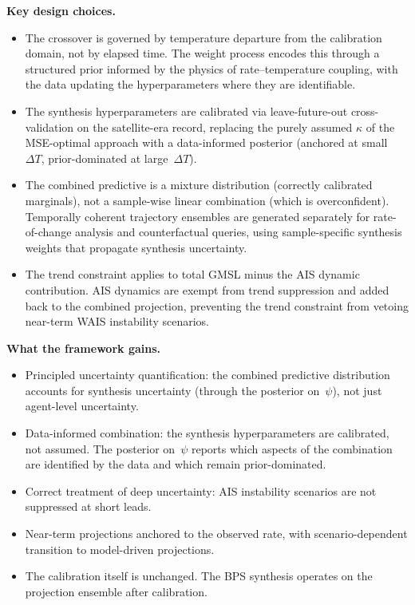 \documentclass[11pt]{article}
\newcommand{\dT}{\Delta T}
\begin{document}
\textbf{Key design choices.}
\begin{itemize}
  \item The crossover is governed by temperature departure from the calibration domain, not by elapsed time.  The weight process encodes this through a structured prior informed by the physics of rate--temperature coupling, with the data updating the hyperparameters where they are identifiable.
  \item The synthesis hyperparameters are calibrated via leave-future-out cross-validation on the satellite-era record, replacing the purely assumed $\kappa$ of the MSE-optimal approach with a data-informed posterior (anchored at small~$\dT$, prior-dominated at large~$\dT$).
  \item The combined predictive is a mixture distribution (correctly calibrated marginals), not a sample-wise linear combination (which is overconfident).  Temporally coherent trajectory ensembles are generated separately for rate-of-change analysis and counterfactual queries, using sample-specific synthesis weights that propagate synthesis uncertainty.
  \item The trend constraint applies to total GMSL minus the AIS dynamic contribution.  AIS dynamics are exempt from trend suppression and added back to the combined projection, preventing the trend constraint from vetoing near-term WAIS instability scenarios.
\end{itemize}

\textbf{What the framework gains.}
\begin{itemize}
  \item Principled uncertainty quantification: the combined predictive distribution accounts for synthesis uncertainty (through the posterior on~$\psi$), not just agent-level uncertainty.
  \item Data-informed combination: the synthesis hyperparameters are calibrated, not assumed.  The posterior on~$\psi$ reports which aspects of the combination are identified by the data and which remain prior-dominated.
  \item Correct treatment of deep uncertainty: AIS instability scenarios are not suppressed at short leads.
  \item Near-term projections anchored to the observed rate, with scenario-dependent transition to model-driven projections.
  \item The calibration itself is unchanged.  The BPS synthesis operates on the projection ensemble after calibration.
\end{itemize}
\end{document}
